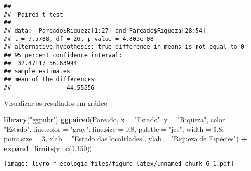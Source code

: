 \documentclass[
]{book}
\newenvironment{Shaded}{\begin{snugshade}}{\end{snugshade}}
\newcommand{\CommentTok}[1]{\textcolor[rgb]{0.56,0.35,0.01}{\textit{#1}}}
\newcommand{\DataTypeTok}[1]{\textcolor[rgb]{0.13,0.29,0.53}{#1}}
\newcommand{\DecValTok}[1]{\textcolor[rgb]{0.00,0.00,0.81}{#1}}
\newcommand{\FloatTok}[1]{\textcolor[rgb]{0.00,0.00,0.81}{#1}}
\newcommand{\KeywordTok}[1]{\textcolor[rgb]{0.13,0.29,0.53}{\textbf{#1}}}
\newcommand{\NormalTok}[1]{#1}
\newcommand{\OperatorTok}[1]{\textcolor[rgb]{0.81,0.36,0.00}{\textbf{#1}}}
\newcommand{\OtherTok}[1]{\textcolor[rgb]{0.56,0.35,0.01}{#1}}
\newcommand{\StringTok}[1]{\textcolor[rgb]{0.31,0.60,0.02}{#1}}
\begin{document}
\begin{Shaded}
\end{Shaded}

\begin{verbatim}
## 
## 	Paired t-test
## 
## data:  Pareado$Riqueza[1:27] and Pareado$Riqueza[28:54]
## t = 7.5788, df = 26, p-value = 4.803e-08
## alternative hypothesis: true difference in means is not equal to 0
## 95 percent confidence interval:
##  32.47117 56.63994
## sample estimates:
## mean of the differences 
##                44.55556
\end{verbatim}

Visualizar os resultados em gráfico

\begin{Shaded}
\begin{Highlighting}[]
\KeywordTok{library}\NormalTok{(}\StringTok{"ggpubr"}\NormalTok{)}
\KeywordTok{ggpaired}\NormalTok{(Pareado, }\DataTypeTok{x =} \StringTok{"Estado"}\NormalTok{, }\DataTypeTok{y =} \StringTok{"Riqueza"}\NormalTok{,}
         \DataTypeTok{color =} \StringTok{"Estado"}\NormalTok{, }\DataTypeTok{line.color =} \StringTok{"gray"}\NormalTok{, }\DataTypeTok{line.size =} \FloatTok{0.8}\NormalTok{, }\DataTypeTok{palette =} \StringTok{"jco"}\NormalTok{, }\DataTypeTok{width =} \FloatTok{0.8}\NormalTok{,}
         \DataTypeTok{point.size =} \DecValTok{3}\NormalTok{, }\DataTypeTok{xlab =} \StringTok{"Estado das localidades"}\NormalTok{, }\DataTypeTok{ylab =} \StringTok{"Riqueza de Espécies"}\NormalTok{) }\OperatorTok{+}
\StringTok{  }\KeywordTok{expand_limits}\NormalTok{(}\DataTypeTok{y=}\KeywordTok{c}\NormalTok{(}\DecValTok{0}\NormalTok{,}\DecValTok{150}\NormalTok{)) }
\end{Highlighting}
\end{Shaded}

\texttt{[image: livro\_r\_ecologia\_files/figure-latex/unnamed-chunk-6-1.pdf]}
\end{document}
